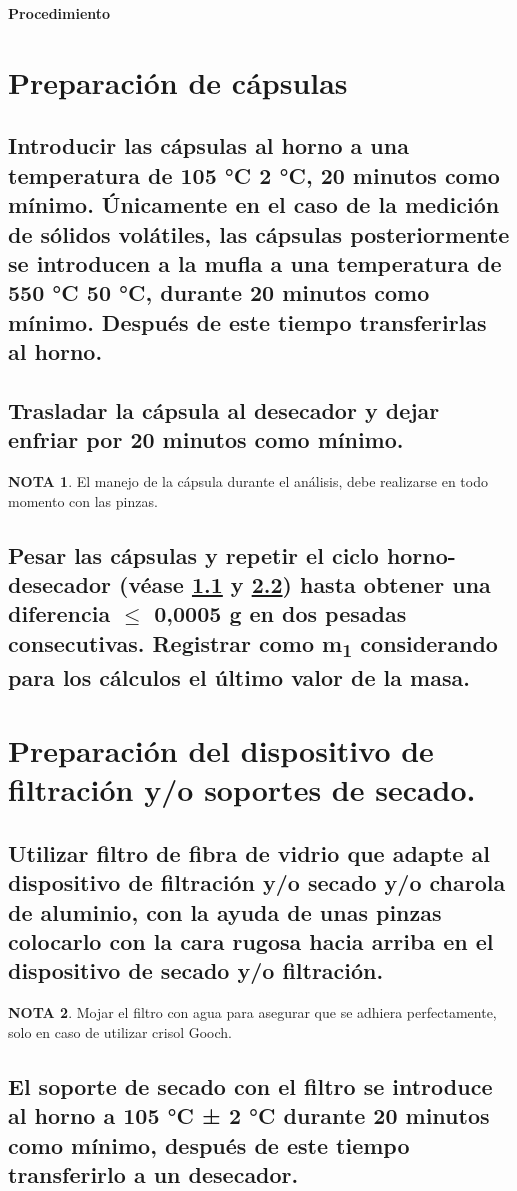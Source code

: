 \documentclass[spanish,12pt,letterpaper,titlepage]{article}
\theoremstyle{definition}
\newtheorem{teor}{NOTA}
\begin{document}
	\pagestyle{fancy}
	\noindent\Large{\textbf{Procedimiento}}
	\normalsize
	\section{Preparación de cápsulas}\label{9.1}
	\subsection{Introducir las cápsulas al horno a una temperatura de 105 °C  2 °C, 20 minutos como mínimo. Únicamente en el caso de la medición de sólidos volátiles, las cápsulas posteriormente se introducen a la mufla a una temperatura de 550 °C  50 °C, durante 20 minutos como mínimo. Después de este tiempo transferirlas al horno.}\label{9.1.1}
	\subsection{Trasladar la cápsula al desecador y dejar enfriar por 20 minutos como mínimo.}\label{9.1.2}
	\begin{teor}
		El manejo de la cápsula durante el análisis, debe realizarse en todo momento con las pinzas.
	\end{teor}
	\subsection{Pesar las cápsulas y repetir el ciclo horno-desecador (véase \ref{9.1.1} y \ref{9.2.2}) hasta obtener una diferencia $\leq$ 0,0005 g en dos pesadas consecutivas. Registrar como m\textsubscript{1} considerando para los cálculos el último valor de la masa.}\label{9.1.3}
	\section{Preparación del dispositivo de filtración y/o soportes de secado.}\label{9.2}
	\subsection{Utilizar filtro de fibra de vidrio que adapte al dispositivo de filtración y/o secado y/o charola de aluminio, con la ayuda de unas pinzas colocarlo con la cara rugosa hacia arriba en el dispositivo de secado y/o filtración.}\label{9.2.1}
	\begin{teor}
		Mojar el filtro con agua para asegurar que se adhiera perfectamente, solo en caso de utilizar crisol Gooch.
	\end{teor}
	\subsection{El soporte de secado con el filtro se introduce al horno a 105 °C ± 2 °C durante 20 minutos como mínimo, después de este tiempo transferirlo a un desecador.} \label{9.2.2}
\end{document}
